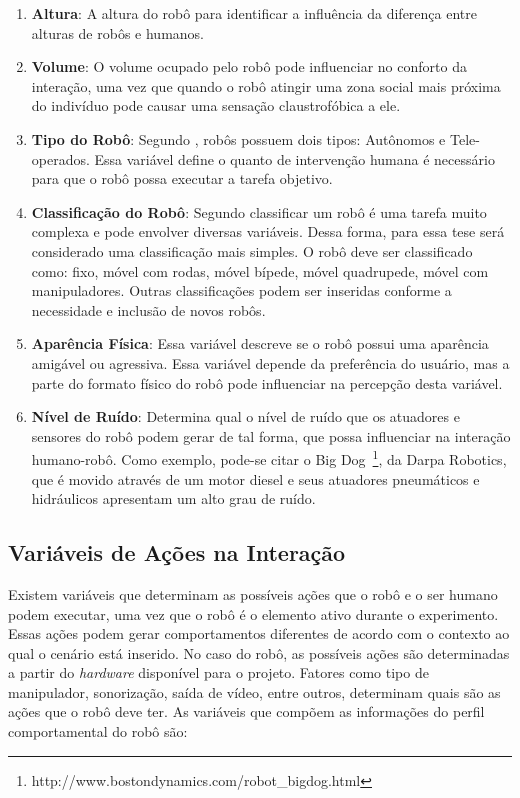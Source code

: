\begin{enumerate}
	\item \textbf{Altura}: A altura do robô para identificar a influência da diferença entre alturas de robôs e humanos.
	\item \textbf{Volume}: O volume ocupado pelo robô pode influenciar no conforto da interação, uma vez que quando o robô atingir uma zona social mais próxima do indivíduo pode causar uma sensação claustrofóbica a ele.
	\item \textbf{Tipo do Robô}: Segundo \textcite{choi:2014}, robôs possuem dois tipos: Autônomos e Tele-operados. Essa variável define o quanto de intervenção humana é necessário para que o robô possa executar a tarefa objetivo.
	\item \textbf{Classificação do Robô}: Segundo \textcite{dobra:2014} classificar um robô é uma tarefa muito complexa e pode envolver diversas variáveis. Dessa forma, para essa tese será considerado uma classificação mais simples. O robô deve ser classificado como: fixo, móvel com rodas, móvel bípede, móvel quadrupede, móvel com manipuladores. Outras classificações podem ser inseridas conforme a necessidade e inclusão de novos robôs.
	\item \textbf{Aparência Física}: Essa variável descreve se o robô possui uma aparência amigável ou agressiva. Essa variável depende da preferência do usuário, mas a parte do formato físico do robô pode influenciar na percepção desta variável.
	\item \textbf{Nível de Ruído}: Determina qual o nível de ruído que os atuadores e sensores do robô podem gerar de tal forma, que possa influenciar na interação humano-robô. Como exemplo, pode-se citar o Big Dog~\footnote{http://www.bostondynamics.com/robot\_bigdog.html}, da Darpa Robotics, que é movido através de um motor diesel e seus atuadores pneumáticos e hidráulicos apresentam um alto grau de ruído.
\end{enumerate}

\subsection{Variáveis de Ações na Interação}
\label{sec:acoes}
Existem variáveis que determinam as possíveis ações que o robô e o ser humano podem executar, uma vez que o robô é o elemento ativo durante o experimento. Essas ações podem gerar comportamentos diferentes de acordo com o contexto ao qual o cenário está inserido. No caso do robô, as possíveis ações são determinadas a partir do \emph{hardware} disponível para o projeto. Fatores como tipo de manipulador, sonorização, saída de vídeo, entre outros, determinam quais são as ações que o robô deve ter. As variáveis que compõem as informações do perfil comportamental do robô são:

